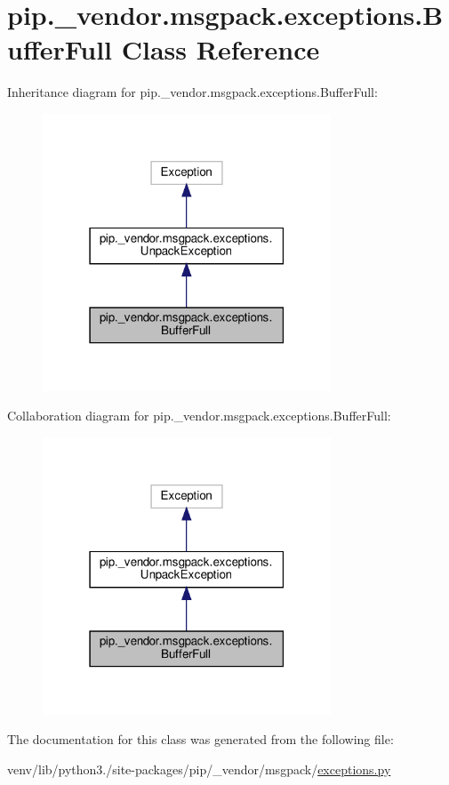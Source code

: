 \hypertarget{classpip_1_1__vendor_1_1msgpack_1_1exceptions_1_1BufferFull}{}\section{pip.\+\_\+vendor.\+msgpack.\+exceptions.\+Buffer\+Full Class Reference}
\label{classpip_1_1__vendor_1_1msgpack_1_1exceptions_1_1BufferFull}


Inheritance diagram for pip.\+\_\+vendor.\+msgpack.\+exceptions.\+Buffer\+Full\+:
\nopagebreak
\begin{figure}[H]
\begin{center}
\leavevmode
\includegraphics[width=243pt]{classpip_1_1__vendor_1_1msgpack_1_1exceptions_1_1BufferFull__inherit__graph}
\end{center}
\end{figure}


Collaboration diagram for pip.\+\_\+vendor.\+msgpack.\+exceptions.\+Buffer\+Full\+:
\nopagebreak
\begin{figure}[H]
\begin{center}
\leavevmode
\includegraphics[width=243pt]{classpip_1_1__vendor_1_1msgpack_1_1exceptions_1_1BufferFull__coll__graph}
\end{center}
\end{figure}


The documentation for this class was generated from the following file\+:\begin{DoxyCompactItemize}
\item 
venv/lib/python3./site-\/packages/pip/\+\_\+vendor/msgpack/\hyperlink{pip_2__vendor_2msgpack_2exceptions_8py}{exceptions.\+py}\end{DoxyCompactItemize}
